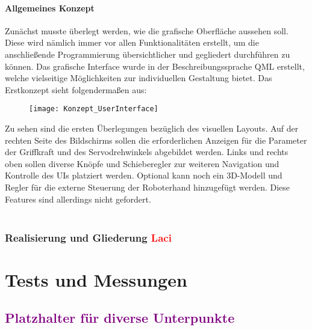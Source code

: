 \documentclass[titlepage,12pt,twoside]{article}
\begin{document}
\paragraph{Allgemeines Konzept}
\hfill \break
\hfill \break
Zunächst musste überlegt werden, wie die grafische Oberfläche aussehen soll. Diese wird nämlich immer vor allen Funktionalitäten 
erstellt, um die anschließende Programmierung übersichtlicher und gegliedert durchführen zu können. Das grafische Interface wurde 
in der Beschreibungssprache QML erstellt, welche vielseitige Möglichkeiten zur individuellen Gestaltung bietet. Das Erstkonzept
sieht folgendermaßen aus:
	\begin{figure}[H]
		\begin{center}
			\scalebox{1.2}
			{\texttt{[image: Konzept\_UserInterface]}}
		\end{center}
	\end{figure}
Zu sehen sind die ersten Überlegungen bezüglich des visuellen Layouts. Auf der rechten Seite des Bildschirms sollen die erforderlichen
Anzeigen für die Parameter der Griffkraft und des Servodrehwinkels abgebildet werden. Links und rechts oben sollen diverse Knöpfe 
und Schieberegler zur weiteren Navigation und Kontrolle des UIs platziert werden. Optional kann noch ein 3D-Modell und Regler für 
die externe Steuerung der Roboterhand hinzugefügt werden. Diese Features sind allerdings nicht gefordert. \\
\\


\subsubsection{Realisierung und Gliederung \textcolor{red}{Laci}}

\section{Tests und Messungen}
\subsection{\textcolor{purple}{Platzhalter für diverse Unterpunkte}}

\end{document}
